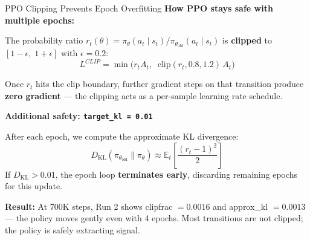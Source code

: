 \documentclass[aspectratio=169,11pt]{beamer}
\begin{document}
\begin{frame}{PPO Clipping Prevents Epoch Overfitting}
  \small
  \textbf{How PPO stays safe with multiple epochs:}

  \medskip
  The probability ratio $r_t(\theta) = \pi_\theta(a_t \mid s_t) / \pi_{\theta_\text{old}}(a_t \mid s_t)$
  is \textbf{clipped} to $[1 - \epsilon,\; 1 + \epsilon]$ with $\epsilon = 0.2$:
  \[
    L^{CLIP} = \min\!\big( r_t A_t,\;\; \mathrm{clip}(r_t, 0.8, 1.2)\, A_t \big)
  \]

  Once $r_t$ hits the clip boundary, further gradient steps on that transition
  produce \textbf{zero gradient} --- the clipping acts as a per-sample learning rate schedule.

  \medskip
  \textbf{Additional safety: \texttt{target\_kl = 0.01}}

  After each epoch, we compute the approximate KL divergence:
  \[
    D_\text{KL}(\pi_{\theta_\text{old}} \| \pi_\theta) \approx
    \mathbb{E}_t\!\left[\frac{(r_t - 1)^2}{2}\right]
  \]
  If $D_\text{KL} > 0.01$, the epoch loop \textbf{terminates early},
  discarding remaining epochs for this update.

  \medskip
  \textbf{Result:} At 700K steps, Run 2 shows clipfrac $= 0.0016$ and
  approx\_kl $= 0.0013$ --- the policy moves gently even with 4 epochs.
  Most transitions are not clipped; the policy is safely extracting signal.
\end{frame}
\end{document}
